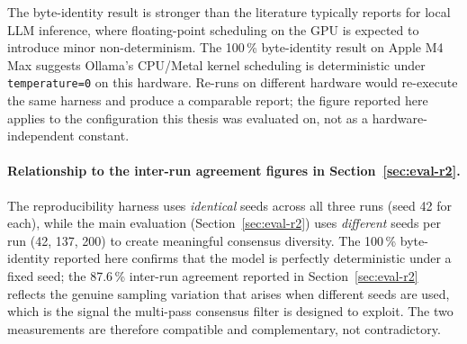 The byte-identity result is stronger than the literature typically reports
for local LLM inference, where floating-point scheduling on the GPU is
expected to introduce minor non-determinism. The 100\,\% byte-identity
result on Apple M4 Max suggests Ollama's CPU/Metal kernel scheduling is
deterministic under \texttt{temperature=0} on this hardware. Re-runs on
different hardware would re-execute the same harness and produce a
comparable report; the figure reported here applies to the
configuration this thesis was evaluated on, not as a
hardware-independent constant.

\paragraph{Relationship to the inter-run agreement figures in Section~\ref{sec:eval-r2}.}
The reproducibility harness uses \emph{identical} seeds across all three
runs (seed 42 for each), while the main evaluation (Section~\ref{sec:eval-r2})
uses \emph{different} seeds per run (42, 137, 200) to create meaningful
consensus diversity. The 100\,\% byte-identity reported here confirms that
the model is perfectly deterministic under a fixed seed; the 87.6\,\%
inter-run agreement reported in Section~\ref{sec:eval-r2} reflects the
genuine sampling variation that arises when different seeds are used, which
is the signal the multi-pass consensus filter is designed to exploit. The
two measurements are therefore compatible and complementary, not contradictory.
